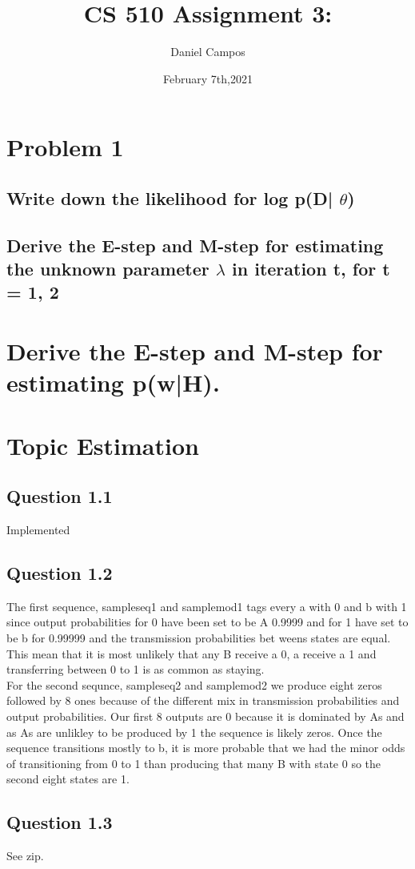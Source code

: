 \documentclass[11pt]{article}
\title{CS 510 Assignment 3:}
\author{Daniel Campos}
\date{February 7th,2021}
\begin{document}
\maketitle
\section{Problem 1}
\subsection{Write down the likelihood for log p(D| $\theta$) }
\subsection{Derive the E-step and M-step for estimating the unknown parameter $\lambda$ in iteration t, for t = 1, 2}
\section{Derive the E-step and M-step for estimating p(w|H).}
\section{Topic Estimation}
\subsection{Question 1.1}
Implemented
\subsection{Question 1.2}
The first sequence, sampleseq1 and samplemod1 tags every a with 0 and b with 1 since output probabilities for 0 have been set to be A 0.9999 and for 1 have set to be b for 0.99999 and the transmission probabilities bet weens states are equal. This mean that it is most unlikely that any B receive a 0, a receive a 1 and transferring between 0 to 1 is as common as staying. \\
For the second sequnce, sampleseq2 and samplemod2 we produce eight zeros followed by 8 ones because of the different mix in transmission probabilities and output probabilities. Our first 8 outputs are 0 because it is dominated by As and as As are unlikley to be produced by 1 the sequence is likely zeros. Once the sequence transitions mostly to b, it is more probable that we had the minor odds of transitioning from 0 to 1 than producing that many B with state 0 so the second eight states are 1. 
\subsection{Question 1.3}
See zip.
\end{document}
